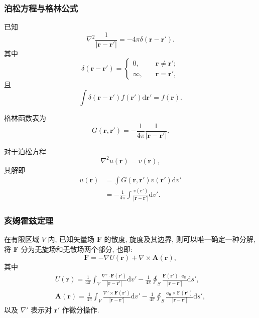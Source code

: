 \subsubsection{泊松方程与格林公式}
已知
\begin{equation} \label{eq:1.4 nabla 2 r r'}
    \nabla^2\frac{1}{|\bm{r}-\bm{r'}|}=-4\pi\delta(\bm{r}-\bm{r'}).
\end{equation}
其中
\begin{equation}
    \delta(\bm{r}-\bm{r'})=\begin{cases}
        0,      & \quad \bm{r}\neq\bm{r'}; \\
        \infty, & \quad \bm{r}=\bm{r'},
    \end{cases}
\end{equation}
且
\begin{equation}
    \int\delta(\bm{r}-\bm{r'})f(\bm{r'})\mathrm{d}\bm{r'}=f(\bm{r}).
\end{equation}

格林函数表为
\begin{equation}
    G(\bm{r},\bm{r}')=-\frac{1}{4\pi}\frac{1}{|\bm{r}-\bm{r}'|}.
\end{equation}

对于泊松方程
\begin{equation}
    \nabla^2 u(\bm{r})=v(\bm{r}),
\end{equation}
其解即
\begin{equation}
    \begin{aligned}
        u(\bm{r}) & =\int G(\bm{r},\bm{r}')v(\bm{r'})\mathrm{d}v'                        \\
                  & =-\frac{1}{4\pi}\int\frac{v(\bm{r'})}{|\bm{r}-\bm{r}'|}\mathrm{d}v'.
    \end{aligned}
\end{equation}

\subsubsection{亥姆霍兹定理}
在有限区域 $V$ 内, 已知矢量场 $\bm{F}$ 的散度, 旋度及其边界, 则可以唯一确定一种分解, 将 $\bm{F}$ 分为无旋场和无散场两个部分, 也即:
\begin{equation}
    \bm{F}=-\nabla U(\bm{r})+\nabla\times\bm{A}(\bm{r}),
\end{equation}
其中
\begin{gather}
    U(\bm{r})=\frac{1}{4\pi}\int_V\frac{\nabla'\cdot\bm{F}(\bm{r'})}{|\bm{r}-\bm{r'}|}\mathrm{d}v'-\frac{1}{4\pi}\oint_S\frac{\bm{F}(\bm{r'})\cdot\bm{e_n}}{|\bm{r}-\bm{r'}|}\mathrm{d}s', \\
    \bm{A}(\bm{r})=\frac{1}{4\pi}\int_V\frac{\nabla'\times\bm{F}(\bm{r'})}{|\bm{r}-\bm{r'}|}\mathrm{d}v'-\frac{1}{4\pi}\oint_S\frac{\bm{e_n}\times\bm{F}(\bm{r'})}{|\bm{r}-\bm{r'}|}\mathrm{d}s',
\end{gather}
以及 $\nabla'$ 表示对 $\bm{r'}$ 作微分操作.
